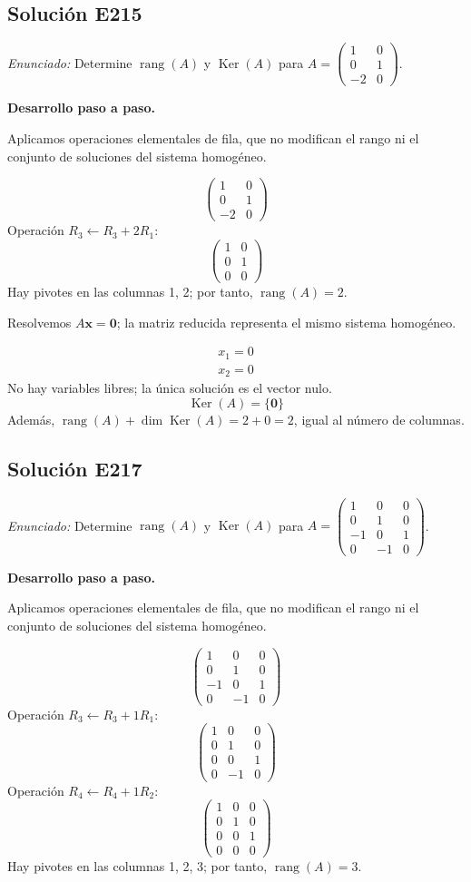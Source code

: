 \documentclass[12pt]{article}
\theoremstyle{remark}
\newcommand{\rang}{\operatorname{rang}}
\newcommand{\Ker}{\operatorname{Ker}}
\newcommand{\vect}[1]{\boldsymbol{#1}}
\newcommand{\solucion}[2]{\Needspace{11\baselineskip}\subsection*{Solución E#1}\noindent\textit{Enunciado:} #2\par\medskip\noindent\textbf{Desarrollo paso a paso.}\par\medskip}
\begin{document}
\medskip

\solucion{215}{Determine $\rang(A)$ y $\Ker(A)$ para $A=\begin{pmatrix}1&0\\0&1\\-2&0\end{pmatrix}$.}
Aplicamos operaciones elementales de fila, que no modifican el rango ni el conjunto de soluciones del sistema homogéneo.

\[
\begin{pmatrix}1&0\\0&1\\-2&0\end{pmatrix}
\]
Operación $R_{3}\leftarrow R_{3}+2R_{1}$:
\[
\begin{pmatrix}1&0\\0&1\\0&0\end{pmatrix}
\]
Hay pivotes en las columnas 1, 2; por tanto, $\boxed{\rang(A)=2}$.

Resolvemos $A\vect x=\vect0$; la matriz reducida representa el mismo sistema homogéneo.

\[
\begin{aligned}x_{1}=0\\x_{2}=0\end{aligned}
\]
No hay variables libres; la única solución es el vector nulo.
\[
\boxed{\Ker(A)=\{\vect0\}}
\]
Además, $\rang(A)+\dim\Ker(A)=2+0=2$, igual al número de columnas.


\medskip

\solucion{217}{Determine $\rang(A)$ y $\Ker(A)$ para $A=\begin{pmatrix}1&0&0\\0&1&0\\-1&0&1\\0&-1&0\end{pmatrix}$.}
Aplicamos operaciones elementales de fila, que no modifican el rango ni el conjunto de soluciones del sistema homogéneo.

\[
\begin{pmatrix}1&0&0\\0&1&0\\-1&0&1\\0&-1&0\end{pmatrix}
\]
Operación $R_{3}\leftarrow R_{3}+1R_{1}$:
\[
\begin{pmatrix}1&0&0\\0&1&0\\0&0&1\\0&-1&0\end{pmatrix}
\]
Operación $R_{4}\leftarrow R_{4}+1R_{2}$:
\[
\begin{pmatrix}1&0&0\\0&1&0\\0&0&1\\0&0&0\end{pmatrix}
\]
Hay pivotes en las columnas 1, 2, 3; por tanto, $\boxed{\rang(A)=3}$.
\end{document}

